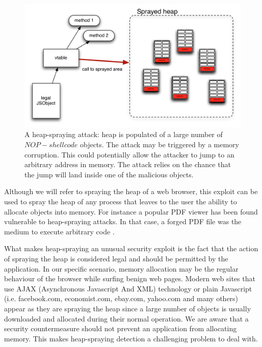  \begin{figure}[htbp]
 \begin{center}
 \includegraphics[scale=0.5]{images/attack}
 \caption{{A heap-spraying attack: heap is populated of a large number of $NOP-shellcode$ objects. The attack may be triggered by a memory corruption. This could potentially allow the attacker to jump to an arbitrary address in memory. The attack relies on the chance that the jump will land inside one of the malicious objects.}}
 \label{heapattack}
 \end{center}
 \end{figure}

Although we will refer to spraying the heap of a web browser, this exploit can be used to spray the heap of any process that leaves to the user the ability to allocate objects into memory. For instance a popular PDF viewer has been found vulnerable to heap-spraying attacks. In that case, a forged PDF file was the medium to execute arbitrary code \cite{adobereader}.

What makes heap-spraying an unusual security exploit is the fact that the action of spraying the heap is considered legal and should be permitted by the application. In our specific scenario, memory allocation may be the regular behaviour of the browser while surfing benign web pages. Modern web sites that use AJAX (Asynchronous Javascript And XML) technology or plain Javascript (i.e. facebook.com, economist.com, ebay.com, yahoo.com and many others) appear as they are spraying the heap since a large number of objects is usually downloaded and allocated during their normal operation. 
We are aware that a security countermeasure should not prevent an application from allocating memory. This makes heap-spraying detection a challenging problem to deal with.


